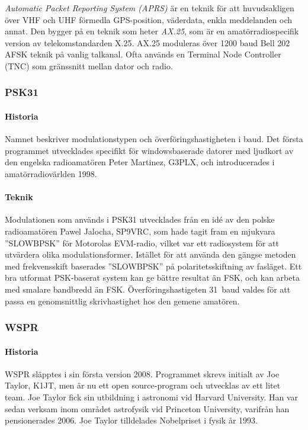 \emph{Automatic Packet Reporting System (APRS)} är en teknik för att
huvudsakligen över VHF och UHF förmedla GPS-position, väderdata, enkla
meddelanden och annat.
Den bygger på en teknik som heter \emph{AX.25}, som är en amatörradiospecifik
version av telekomstandarden X.25.
AX.25 moduleras över 1200 baud Bell 202 AFSK teknik på vanlig talkanal.
Ofta används en Terminal Node Controller (TNC) som gränssnitt mellan dator och
radio.

\subsubsection{PSK31}
\label{modulation_psk31}

\paragraph{Historia}

Namnet beskriver modulationstypen och överföringshastigheten i baud.
Det första programmet utvecklades specifikt för windowsbaserade datorer med
ljudkort av den engelska radioamatören Peter Martinez, G3PLX, och
introducerades i amatörradiovärlden 1998.

\paragraph{Teknik}

Modulationen som används i PSK31 utvecklades från en idé av den polske
radioamatören Pawel Jalocha, SP9VRC, som hade tagit fram en mjukvara
''SLOWBPSK'' för Motorolas EVM-radio, vilket var ett radiosystem för att
utvärdera olika modulationsformer.
Istället för att använda den gängse metoden med frekvensskift baserades
''SLOWBPSK'' på polaritetsskiftning av fasläget.
Ett bra utformat PSK-baserat system kan ge bättre resultat än FSK, och kan
arbeta med smalare bandbredd än FSK.
Överföringshastigeten 31~baud valdes för att passa en genomsnittlig
skrivhastighet hos den gemene amatören.

\subsubsection{WSPR}

\paragraph{Historia}

WSPR släpptes i sin första version 2008.
Programmet skrevs initialt av Joe Taylor, K1JT, men är nu ett
open source-program och utvecklas av ett litet team.
Joe Taylor fick sin utbildning i astronomi vid Harvard University.
Han var sedan verksam inom området astrofysik vid Princeton University,
varifrån han pensionerades 2006.
Joe Taylor tilldelades Nobelpriset i fysik år 1993.

